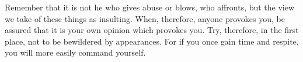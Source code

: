 Remember that it is not he who gives abuse or blows, who affronts, but the view
we take of these things as  insulting. When, therefore, anyone provokes you, be
assured that it is your own opinion  which provokes you. Try, therefore, in the
first place, not to be bewildered by appearances. For if you once gain time and
respite, you will more easily command yourself.
